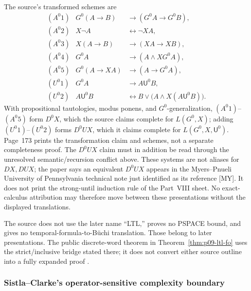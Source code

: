 The source's transformed schemes are
\[
\begin{array}{rcl}
(A^0 1)&G^0(A\to B)&\to(G^0A\to G^0B),\\
(A^0 2)&X\neg A&\leftrightarrow\neg XA,\\
(A^0 3)&X(A\to B)&\to(XA\to XB),\\
(A^0 4)&G^0A&\to(A\land XG^0A),\\
(A^0 5)&G^0(A\to XA)&\to(A\to G^0A),\\[2pt]
(U^0 1)&G^0A&\to A\mathbin{\mathsf U^0}B,\\
(U^0 2)&A\mathbin{\mathsf U^0}B
 &\leftrightarrow
 B\lor\bigl(A\land X(A\mathbin{\mathsf U^0}B)\bigr).
\end{array}
\]
With propositional tautologies, modus ponens, and \(G^0\)-generalization,
\((A^0 1)\)--\((A^0 5)\) form \(D^0X\), which the source claims complete for
\(L(G^0,X)\); adding \((U^0 1)\)--\((U^0 2)\) forms \(D^0UX\), which it claims
complete for \(L(G^0,X,\mathsf U^0)\).  Page~173 prints the transformation
claim and schemes, not a separate completeness proof.  The \(D^0UX\) claim
must in addition be read through the unresolved semantic/recursion conflict
above.  These systems are not aliases for \(DX,DUX\); the paper says an
equivalent \(D^0UX\) appears in the Myers--Pnueli University of Pennsylvania
technical note just identified as its reference [MY].  It does not print the
strong-until induction rule of the Part~VIII sheet.  No exact-calculus attribution may
therefore move between these presentations without the displayed translations.

The source does not use the later name ``LTL,'' proves no PSPACE bound, and
gives no temporal-formula-to-B\"uchi translation.  Those belong to later
presentations.  The public discrete-word theorem in
Theorem~\ref{thm:p09-ltl-fo} uses the strict/inclusive bridge stated there; it
does not convert either source outline into a fully expanded proof
\cite[p.~173]{GabbayPnueliShelahStavi1980}.

\subsubsection{Sistla--Clarke's operator-sensitive complexity boundary}

